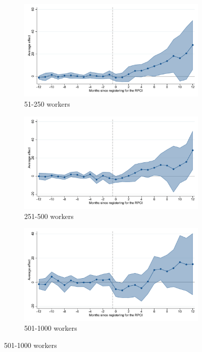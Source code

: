 \clearpage

\begin{figure}[H]
    \centering
    \ContinuedFloat
    \caption{(Cont.) Event studies - RPCI effect on wages}

    \begin{subfigure}{0.32\textwidth}
    \caption{51-250 workers}
    \includegraphics[width=\textwidth]{04_Figures/muestra_10porciento/event_study_sal_cierre_size_51_dcdh_connected.pdf}
    \end{subfigure}
    \begin{subfigure}{0.32\textwidth}
    \caption{251-500 workers}
    \includegraphics[width=\textwidth]{04_Figures/muestra_10porciento/event_study_sal_cierre_size_251_dcdh_connected.pdf}
    \end{subfigure}
    \begin{subfigure}{0.32\textwidth}
    \caption{501-1000 workers}
    \includegraphics[width=\textwidth]{04_Figures/muestra_10porciento/event_study_sal_cierre_size_501_dcdh_connected.pdf}
    \end{subfigure}
    

\end{figure}
